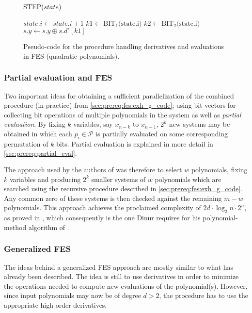 \begin{figure}[t]
    \begin{alg}
        \caption{STEP($state$)} \label{alg:fes_step}
        $state.i \gets state.i + 1$\;
        $k1 \gets \text{BIT}_1\text{(state.i)}$\;
        $k2 \gets \text{BIT}_2\text{(state.i)}$\;
        $s.y \gets s.y \oplus s.d'[k1]$\;
    \end{alg}
    \caption{Pseudo-code for the procedure handling derivatives and evaluations in FES (quadratic polynomials).}
\end{figure}

\subsubsection{Partial evaluation and FES}

Two important ideas for obtaining a sufficient parallelization of the combined procedure (in practice) from \cref{sec:prereq:fes:exh_g_code}; using bit-vectors for collecting bit operations of multiple polynomials in the system as well as \textit{partial evaluation}. By fixing $k$ variables, say $x_{n-k}$ to $x_{n-1}$, $2^k$ new systems may be obtained in which each $p_i \in \mathcal{P}$ is partially evaluated on some corresponding permutation of $k$ bits. Partial evaluation is explained in more detail in \cref{sec:prereq:partial_eval}.

The approach used by the authors of \cite{ches-2010-23990, cryptoeprint:2013/436} was therefore to select $w$ polynomials, fixing $k$ variables and producing $2^k$ smaller systems of $w$ polynomials which are searched using the recursive procedure described in \cref{sec:prereq:fes:exh_g_code}. Any common zero of these systems is then checked against the remaining $m-w$ polynomials. This approach achieves the proclaimed complexity of $2d\cdot\log_2 n \cdot 2^n$, as proved in \cite{ches-2010-23990}, which consequently is the one Dinur requires for his polynomial-method algorithm of \cite{eurocrypt-2021-30841}.

\subsubsection{Generalized FES} \label{sec:ext:fes_interp:g_fes}
The ideas behind a generalized FES approach are mostly similar to what has already been described. The idea is still to use derivatives in order to minimize the operations needed to compute new evaluations of the polynomial(s). However, since input polynomials may now be of degree $d > 2$, the procedure has to use the appropriate high-order derivatives.

